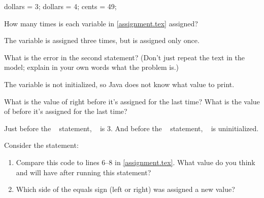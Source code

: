 \vspace{1em}
\hfill
\begin{minipage}[t]{0.5\textwidth}

\vspace{-1em}
\lstset{firstnumber=6}
\begin{javanum}
dollars = 3;
dollars = 4;
cents = 49;
\end{javanum}

\end{minipage}
\hfill
\begin{minipage}[t]{0.4\textwidth}

\par\vspace{1em}

\end{minipage}
\vspace{1ex}




\Q How many times is each variable in \ref{assignment.tex} assigned?

\begin{answer}
The variable  is assigned three times, but  is assigned only once.
\end{answer}


\Q What is the error in the second  statement? (Don't just repeat the text in the model; explain in your own words what the problem is.)

\begin{answer}
The variable  is not initialized, so Java does not know what value to print.
\end{answer}


\Q What is the value of  right before it's assigned for the last time?
What is the value of  before it's assigned for the last time?

\begin{answer}
Just before the ~ statement, ~ is 3.
And before the ~ statement, ~ is uninitialized.
\end{answer}




\Q Consider the statement: ~

\begin{enumerate}

\item Compare this code to lines 6--8 in \ref{assignment.tex}.
What value do you think  and  will have after running this statement?


\item Which side of the equals sign (left or right) was assigned a new value?


\end{enumerate}


